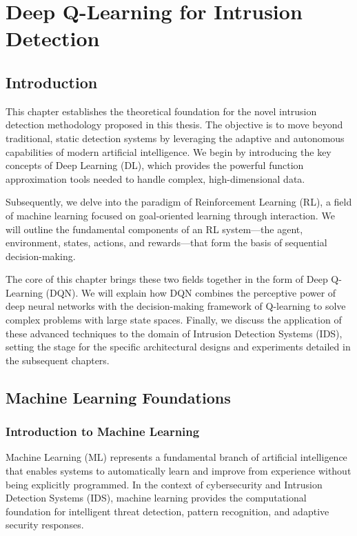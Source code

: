 \documentclass[12pt]{report}
\begin{document}
\chapter{Deep Q-Learning for Intrusion Detection}
\label{chap:dqn-for-ids}

\section{Introduction}
This chapter establishes the theoretical foundation for the novel intrusion detection methodology proposed in this thesis. The objective is to move beyond traditional, static detection systems by leveraging the adaptive and autonomous capabilities of modern artificial intelligence. We begin by introducing the key concepts of Deep Learning (DL), which provides the powerful function approximation tools needed to handle complex, high-dimensional data.

Subsequently, we delve into the paradigm of Reinforcement Learning (RL), a field of machine learning focused on goal-oriented learning through interaction. We will outline the fundamental components of an RL system—the agent, environment, states, actions, and rewards—that form the basis of sequential decision-making.

The core of this chapter brings these two fields together in the form of Deep Q-Learning (DQN). We will explain how DQN combines the perceptive power of deep neural networks with the decision-making framework of Q-learning to solve complex problems with large state spaces. Finally, we discuss the application of these advanced techniques to the domain of Intrusion Detection Systems (IDS), setting the stage for the specific architectural designs and experiments detailed in the subsequent chapters.
\section{Machine Learning Foundations} 

\subsection{Introduction to Machine Learning}

Machine Learning (ML) represents a fundamental branch of artificial intelligence that enables systems to automatically learn and improve from experience without being explicitly programmed. In the context of cybersecurity and Intrusion Detection Systems (IDS), machine learning provides the computational foundation for intelligent threat detection, pattern recognition, and adaptive security responses.
\end{document}
